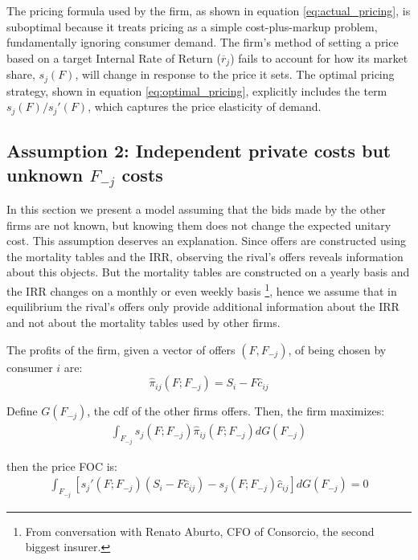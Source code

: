\documentclass[12pt]{article}
\theoremstyle{plain}
\theoremstyle{plain}
\begin{document}
 The pricing formula used by the firm, as shown in equation \ref{eq:actual_pricing}, is suboptimal because it treats pricing as a simple cost-plus-markup problem, fundamentally ignoring consumer demand. The firm's method of setting a price based on a target Internal Rate of Return (\(\overline{r}_j\)) fails to account for how its market share, \(s_j(F)\), will change in response to the price it sets. The optimal pricing strategy, shown in equation \ref{eq:optimal_pricing}, explicitly includes the term \(s_j(F)/s_j'(F)\), which captures the price elasticity of demand. 



\subsection{Assumption 2: Independent private costs but unknown $F_{-j}$ costs}\label{sec:interdependent}


In this section we present a model assuming that the bids made by the other firms are not known, but knowing them does not change the expected unitary cost. 
This assumption deserves an explanation. Since offers are constructed using the mortality tables and the IRR, observing the rival's offers reveals information about this objects. But the mortality tables are constructed on a yearly basis and the IRR changes on a monthly or even weekly basis \footnote{From conversation with Renato Aburto, CFO of Consorcio, the second biggest insurer.}, hence we assume that in equilibrium the rival's offers only provide additional information about the IRR and not about the mortality tables used by other firms. 

The profits of the firm, given a vector of offers $(F, F_{-j})$, of being chosen by consumer $i$ are: 
\begin{equation}
\hat{\pi}_{ij}(F;F_{-j})=S_{i}-F\hat{c}_{ij}
\end{equation}

Define $G(F_{-j})$, the cdf of the other firms offers. Then, the firm maximizes: 
\begin{align*}
    \int_{F_{-j}} s_j(F; F_{-j})\hat{\pi}_{ij}(F;F_{-j}) dG(F_{-j})
\end{align*}


then the price FOC is: 
\begin{align*}
    \int_{F_{-j}} \left[s_j'(F; F_{-j}) \left(S_{i}-F\hat{c}_{ij}\right)- s_j(F; F_{-j}) \hat{c}_{ij}  \right]dG(F_{-j})=0
\end{align*} 
\end{document}
